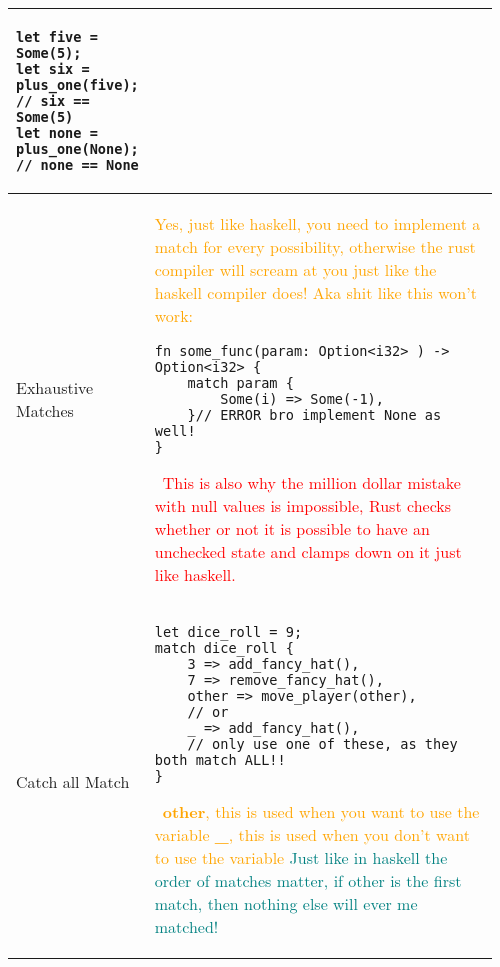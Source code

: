 \documentclass[main.tex,fontsize=8pt,paper=a4,paper=portrait,DIV=calc,]{scrartcl}
\begin{document}
\begin{table}[ht!]
\begin{tabular}{|m{0.2\linewidth}|m{0.755\linewidth}|}
\begin{lstlisting}
let five = Some(5);
let six = plus_one(five); // six == Some(5)
let none = plus_one(None); // none == None
\end{lstlisting}\\
\hline
Exhaustive Matches & 
\textcolor{orange}{Yes, just like haskell, you need to implement a match for every possibility, otherwise the rust compiler will scream at you just like the haskell compiler does!\newline
Aka shit like this won't work:}\newline
\begin{lstlisting}
fn some_func(param: Option<i32> ) -> Option<i32> {
    match param {
        Some(i) => Some(-1),
    }// ERROR bro implement None as well!
}
\end{lstlisting}
\, \newline
\textcolor{red}{This is also why the million dollar mistake with null values is impossible, Rust checks whether or not it is possible to have an unchecked state and clamps down on it just like haskell.}\\
\hline
Catch all Match &
\begin{lstlisting}
let dice_roll = 9;
match dice_roll {
    3 => add_fancy_hat(),
    7 => remove_fancy_hat(),
    other => move_player(other),
    // or 
    _ => add_fancy_hat(),
    // only use one of these, as they both match ALL!!
}
\end{lstlisting}
\, \newline
\textcolor{orange}{\textbf{other}, this is used when you want to use the variable}\newline
\textcolor{orange}{\textbf{\_}, this is used when you don't want to use the variable}\newline
\textcolor{teal}{Just like in haskell the order of matches matter, if other is the first match, then nothing else will ever me matched!}\\
\hline
\end{tabular}
\end{table}
\pagebreak
\end{document}
